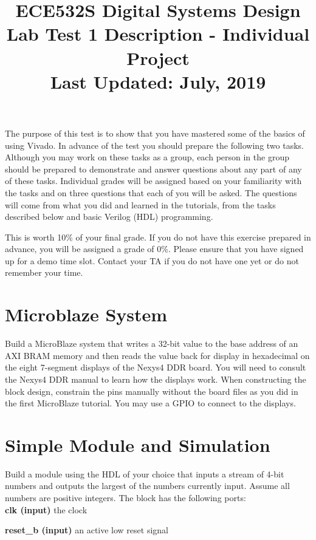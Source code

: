 \documentclass[11pt]{article}
\title{ECE532S Digital Systems Design \\ \vspace{0.4cm}
       \Large Lab Test 1 Description - Individual Project \\ \vspace{0.4cm}
       \small Last Updated: July, 2019}
\author{ }
\date{ }
\begin{document}
\maketitle
\vspace{-1cm}

The purpose of this test is to show that you have mastered some of the basics of using Vivado. In advance of
the test you should prepare the following two tasks. Although you may work on these tasks as a group, each
person in the group should be prepared to demonstrate and answer questions about any part of any of these
tasks. Individual grades will be assigned based on your familiarity with the tasks and on three questions that
each of you will be asked. The questions will come from what you did and learned in the tutorials, from the
tasks described below and basic Verilog (HDL) programming.

This is worth 10\% of your final grade. If you do not have this exercise prepared in advance, you will be
assigned a grade of 0\%. Please ensure that you have signed up for a demo time slot. Contact your TA if you
do not have one yet or do not remember your time.



\section{Microblaze System}
Build a MicroBlaze system that writes a 32-bit value to the base address of an AXI BRAM memory
and then reads the value back for display in hexadecimal on the eight 7-segment displays of the
Nexys4 DDR board. You will need to consult the Nexys4 DDR manual to learn how the displays
work. When constructing the block design, constrain the pins manually without the board files as you
did in the first MicroBlaze tutorial. You may use a GPIO to connect to the displays.

\section{Simple Module and Simulation}
Build a module using the HDL of your choice that inputs a stream of 4-bit numbers and outputs the
largest of the numbers currently input. Assume all numbers are positive integers.
The block has the following ports:
\\

\textbf{clk (input)} the clock

\textbf{reset\_b (input)} an active low reset signal
\end{document}

